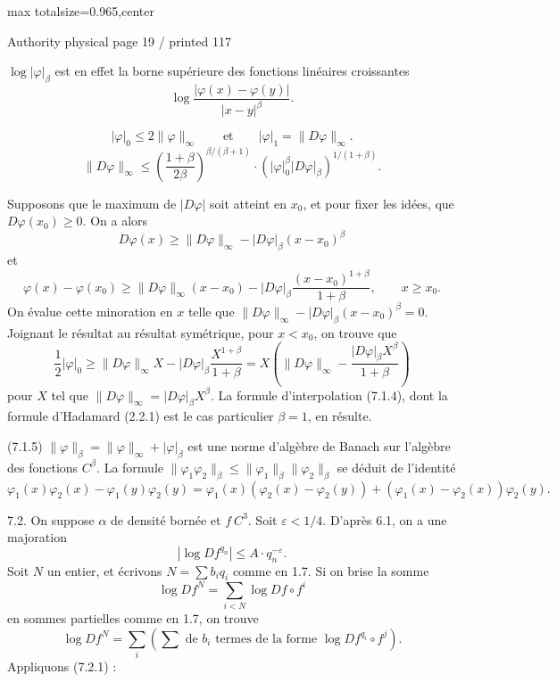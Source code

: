 \documentclass{article}
\begin{document}
\newpage
\noindent\begin{adjustbox}{max totalsize={\textwidth}{0.965\textheight},center}\begin{minipage}{\textwidth}
\noindent\hfill\scriptsize Authority physical page 19 / printed 117\par\normalsize
\(\log|\varphi|_\beta\) est en effet la borne supérieure des fonctions linéaires croissantes
\[
\log\frac{|\varphi(x)-\varphi(y)|}{|x-y|^\beta}.
\]

\[
\tag{7.1.3}
|\varphi|_0\leq2\lVert\varphi\rVert_\infty
\qquad\text{et}\qquad
|\varphi|_1=\lVert D\varphi\rVert_\infty.
\]
\[
\tag{7.1.4}
\lVert D\varphi\rVert_\infty
\leq\left(\frac{1+\beta}{2\beta}\right)^{\beta/(\beta+1)}
\cdot\left(|\varphi|_0^\beta|D\varphi|_\beta\right)^{1/(1+\beta)}.
\]

Supposons que le maximum de \(|D\varphi|\) soit atteint en \(x_0\), et pour fixer les idées, que \(D\varphi(x_0)\geq0\). On a alors
\[
D\varphi(x)\geq\lVert D\varphi\rVert_\infty-|D\varphi|_\beta(x-x_0)^\beta
\]
et
\[
\varphi(x)-\varphi(x_0)
\geq\lVert D\varphi\rVert_\infty(x-x_0)
-|D\varphi|_\beta\frac{(x-x_0)^{1+\beta}}{1+\beta},
\qquad x\geq x_0.
\]
On évalue cette minoration en \(x\) telle que \(\lVert D\varphi\rVert_\infty-|D\varphi|_\beta(x-x_0)^\beta=0\). Joignant le résultat au résultat symétrique, pour \(x<x_0\), on trouve que
\[
\frac12|\varphi|_0
\geq\lVert D\varphi\rVert_\infty X
-|D\varphi|_\beta\frac{X^{1+\beta}}{1+\beta}
=X\left(\lVert D\varphi\rVert_\infty-
\frac{|D\varphi|_\beta X^\beta}{1+\beta}\right)
\]
pour \(X\) tel que \(\lVert D\varphi\rVert_\infty=|D\varphi|_\beta X^\beta\). La formule d’interpolation (7.1.4), dont la formule d’Hadamard (2.2.1) est le cas particulier \(\beta=1\), en résulte.

(7.1.5) \(\lVert\varphi\rVert_\beta=\lVert\varphi\rVert_\infty+|\varphi|_\beta\) est une norme d’algèbre de Banach sur l’algèbre des fonctions \(C^\beta\). La formule \(\lVert\varphi_1\varphi_2\rVert_\beta\leq\lVert\varphi_1\rVert_\beta\lVert\varphi_2\rVert_\beta\) se déduit de l’identité
\[
\varphi_1(x)\varphi_2(x)-\varphi_1(y)\varphi_2(y)
=\varphi_1(x)(\varphi_2(x)-\varphi_2(y))
+(\varphi_1(x)-\varphi_2(x))\varphi_2(y).
\]

7.2. On suppose \(\alpha\) de densité bornée et \(f\ C^3\). Soit \(\varepsilon<1/4\). D’après 6.1, on a une majoration
\[
\tag{7.2.1}
|\log Df^{q_n}|\leq A\cdot q_n^{-\varepsilon}.
\]
Soit \(N\) un entier, et écrivons \(N=\sum b_iq_i\) comme en 1.7. Si on brise la somme
\[
\log Df^N=\sum_{i<N}\log Df\circ f^i
\]
en sommes partielles comme en 1.7, on trouve
\[
\tag{7.2.2}
\log Df^N=\sum_i\left(\sum\text{ de }b_i\text{ termes de la forme }\log Df^{q_i}\circ f^j\right).
\]
Appliquons (7.2.1) :
\end{minipage}\end{adjustbox}
\end{document}
